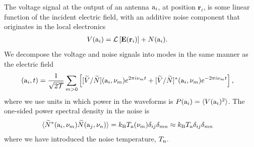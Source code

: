 \documentclass[11pt]{article}
\numberwithin{equation}{section}
\newcommand{\bt}[1]{\mathbf{#1}}
\newcommand{\wt}[1]{\widetilde{#1}}
\newcommand{\kb}{k_{\rm B}}
\begin{document}
The voltage signal at the output of an antenna ${\rm a}_i$, at position $\bt r_i$, is some linear function of the incident electric field, with an additive noise component that originates in the local electronics
\begin{align}
  V({\rm a}_i) & = \mathcal{L}\left[{\bt E}({\bt r}_i)\right] + N({\rm a}_i) \mbox{.} \label{eq:linrealsp}
\end{align}
We decompose the voltage and noise signals into modes in the same manner as the electric field
\begin{align}
  [V/N]({\rm a}_i, t) & = \frac{1}{\sqrt{2 \cal T}} \sum_{m > 0} \left[ [\wt{V}/\wt{N}]({\rm a}_i, \nu_m) e^{2\pi i \nu_m t} + [\wt{V}/\wt{N}]^\ast({\rm a}_i, \nu_m) e^{-2\pi i \nu_m t} \right] \mbox{,} \label{eq:Vdft}
\end{align}
where we use units in which power in the waveforms is $P({\rm a}_i) = \langle V({\rm a}_i)^2 \rangle$. The one-sided power spectral density in the noise is
\begin{align}
  \langle \wt{N}^\ast({\rm a}_i, \nu_m) \wt{N}({\rm a}_j, \nu_n) \rangle & = \kb T_{\rm n}(\nu_m) \delta_{i j} \delta_{m n} \approx \kb T_{\rm n} \delta_{i j} \delta_{m n} \label{eq:noisetemp}
\end{align}
where we have introduced the noise temperature, $T_{\rm n}$.
\end{document}
